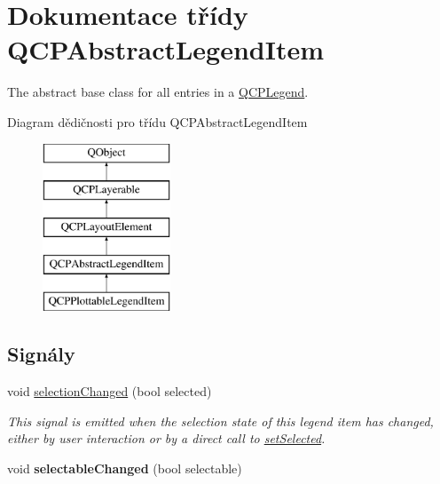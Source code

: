 \hypertarget{classQCPAbstractLegendItem}{}\section{Dokumentace třídy Q\+C\+P\+Abstract\+Legend\+Item}
\label{classQCPAbstractLegendItem}


The abstract base class for all entries in a \hyperlink{classQCPLegend}{Q\+C\+P\+Legend}.  


Diagram dědičnosti pro třídu Q\+C\+P\+Abstract\+Legend\+Item\begin{figure}[H]
\begin{center}
\leavevmode
\includegraphics[height=5.000000cm]{classQCPAbstractLegendItem}
\end{center}
\end{figure}
\subsection*{Signály}
\begin{DoxyCompactItemize}
\item 
\hypertarget{classQCPAbstractLegendItem_a7cb61fdfbaf69c590bacb8f9e7099d9e}{}void \hyperlink{classQCPAbstractLegendItem_a7cb61fdfbaf69c590bacb8f9e7099d9e}{selection\+Changed} (bool selected)\label{classQCPAbstractLegendItem_a7cb61fdfbaf69c590bacb8f9e7099d9e}

\begin{DoxyCompactList}\small\item\em This signal is emitted when the selection state of this legend item has changed, either by user interaction or by a direct call to \hyperlink{classQCPAbstractLegendItem_a6eed93b0ab99cb3eabb043fb08179c2b}{set\+Selected}. \end{DoxyCompactList}\item 
\hypertarget{classQCPAbstractLegendItem_abc4d779b938cc9235f9196737dbaa6bd}{}void {\bfseries selectable\+Changed} (bool selectable)\label{classQCPAbstractLegendItem_abc4d779b938cc9235f9196737dbaa6bd}

\end{DoxyCompactItemize}
